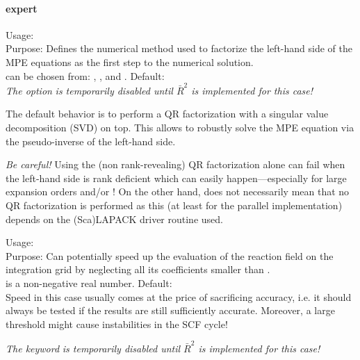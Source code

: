 \paragraph{expert}

{
  \noindent
  Usage:   \\[1.0ex] 
  Purpose: Defines the numerical method used to factorize the 
    left-hand side of the MPE equations as the first step to 
    the numerical solution. \\[1.0ex]
   can be chosen from: , , 
    and . Default:  \\
}
\emph{The option}  \emph{is temporarily disabled until
$\bar{R}^2$ is implemented for this case!}

The default behavior is to perform a QR factorization with a 
singular value decomposition (SVD) on top. This allows to 
robustly solve the MPE equation via the pseudo-inverse of 
the left-hand side. 

\emph{Be careful!} Using the (non rank-revealing) QR 
factorization alone can fail when the left-hand side is 
rank deficient which can easily happen---especially 
for large expansion orders 
 and/or ! 
On the other hand,  does not necessarily mean that 
no QR factorization is performed as this (at least for 
the parallel implementation) depends on the (Sca)LAPACK 
driver routine used. 


{
  \noindent
  Usage:  
     \\[1.0ex] 
  Purpose: Can potentially speed up the evaluation of 
    the reaction field on the integration grid by 
    neglecting all its coefficients smaller than
    . \\[1.0ex]
   is a non-negative real number. 
    Default:  \\
}
Speed in this case usually comes at the price of 
sacrificing accuracy, i.e. it should always be tested 
if the results are still sufficiently accurate. 
Moreover, a large threshold might cause instabilities 
in the SCF cycle!

\emph{The keyword}  \emph{is temporarily disabled until
$\bar{R}^2$ is implemented for this case!}

